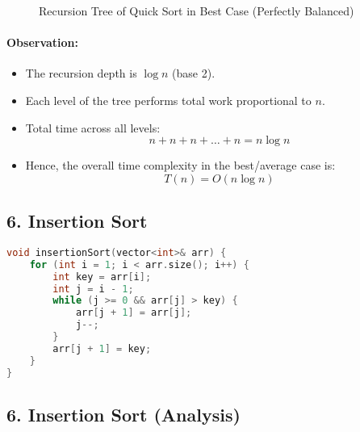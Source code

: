 \begin{figure}[H]
\centering
{}
\caption{Recursion Tree of Quick Sort in Best Case (Perfectly Balanced)}
\end{figure}

\paragraph{Observation:}
\begin{itemize}
  \item The recursion depth is \( \log n \) (base 2).
  \item Each level of the tree performs total work proportional to \( n \).
  \item Total time across all levels:
  \[
  n + n + n + \dots + n = n \log n
  \]
  \item Hence, the overall time complexity in the best/average case is:
  \[
  \boxed{T(n) = O(n \log n)}
  \]
\end{itemize}

\subsection*{\textbf{6. Insertion Sort}}
\begin{lstlisting}[language=C++, caption=Insertion Sort]
void insertionSort(vector<int>& arr) {
    for (int i = 1; i < arr.size(); i++) {
        int key = arr[i];
        int j = i - 1;
        while (j >= 0 && arr[j] > key) {
            arr[j + 1] = arr[j];
            j--;
        }
        arr[j + 1] = key;
    }
}
\end{lstlisting}

\subsection*{\textbf{6. Insertion Sort (Analysis)}}

